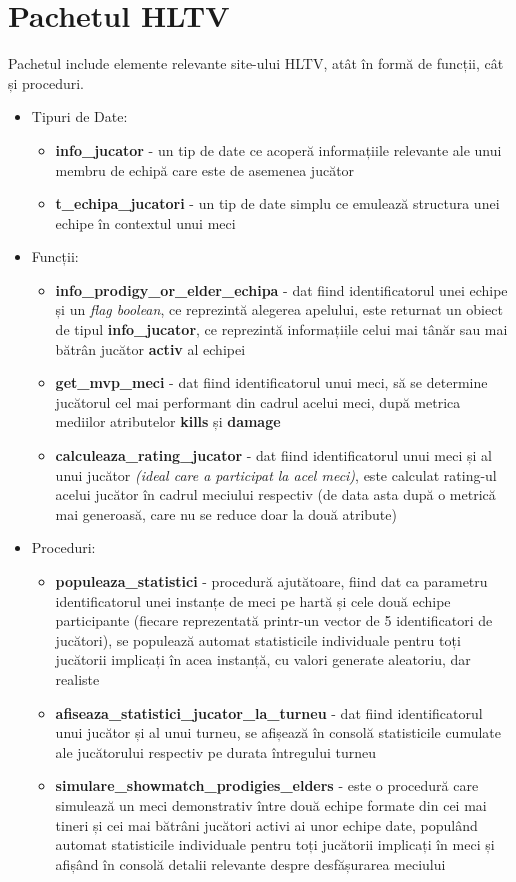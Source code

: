 \documentclass[11pt, a4paper]{article}
\begin{document}
\section{Pachetul HLTV}
Pachetul include elemente relevante site-ului HLTV, atât în formă de funcții, cât și proceduri.
\begin{itemize}
    \item Tipuri de Date:
    \begin{itemize}
        \item \textbf{info\_jucator} - un tip de date ce acoperă informațiile relevante ale unui membru de echipă care este de asemenea jucător
        \item \textbf{t\_echipa\_jucatori} - un tip de date simplu ce emulează structura unei echipe în contextul unui meci
    \end{itemize}
    \item Funcții:
    \begin{itemize}
        \item \textbf{info\_prodigy\_or\_elder\_echipa} - dat fiind identificatorul unei echipe și un \textit{flag boolean}, ce reprezintă alegerea apelului, este returnat un obiect de tipul \textbf{info\_jucator}, ce reprezintă informațiile celui mai tânăr sau mai bătrân jucător \textbf{activ} al echipei
        \item \textbf{get\_mvp\_meci} - dat fiind identificatorul unui meci, să se determine jucătorul cel mai performant din cadrul acelui meci, după metrica mediilor atributelor \textbf{kills} și \textbf{damage}
        \item \textbf{calculeaza\_rating\_jucator} - dat fiind identificatorul unui meci și al unui jucător \textit{(ideal care a participat la acel meci)}, este calculat rating-ul acelui jucător în cadrul meciului respectiv (de data asta după o metrică mai generoasă, care nu se reduce doar la două atribute)
    \end{itemize}
    \item Proceduri:
    \begin{itemize}
        \item \textbf{populeaza\_statistici} - procedură ajutătoare, fiind dat ca parametru identificatorul unei instanțe de meci pe hartă și cele două echipe participante (fiecare reprezentată printr-un vector de 5 identificatori de jucători), se populează automat statisticile individuale pentru toți jucătorii implicați în acea instanță, cu valori generate aleatoriu, dar realiste
        \item \textbf{afiseaza\_statistici\_jucator\_la\_turneu} - dat fiind identificatorul unui jucător și al unui turneu, se afișează în consolă statisticile cumulate ale jucătorului respectiv pe durata întregului turneu
        \item \textbf{simulare\_showmatch\_prodigies\_elders} - este o procedură care simulează un meci demonstrativ între două echipe formate din cei mai tineri și cei mai bătrâni jucători activi ai unor echipe date, populând automat statisticile individuale pentru toți jucătorii implicați în meci și afișând în consolă detalii relevante despre desfășurarea meciului
    \end{itemize}
\end{itemize}
\end{document}
